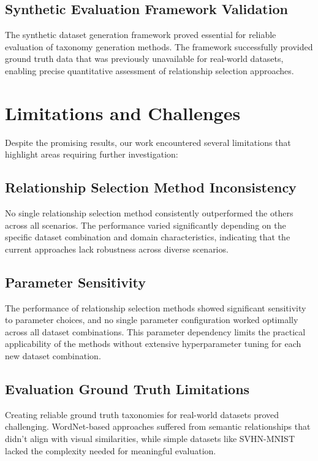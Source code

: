 \subsection{Synthetic Evaluation Framework Validation}

The synthetic dataset generation framework proved essential
for reliable evaluation of taxonomy generation methods.
The framework successfully provided ground truth data
that was previously unavailable for real-world datasets,
enabling precise quantitative assessment of relationship selection approaches.

\section{Limitations and Challenges}

Despite the promising results, our work encountered several limitations
that highlight areas requiring further investigation:

\subsection{Relationship Selection Method Inconsistency}

No single relationship selection method consistently outperformed the others across all scenarios.
The performance varied significantly depending on the specific dataset combination
and domain characteristics,
indicating that the current approaches lack robustness across diverse scenarios.

\subsection{Parameter Sensitivity}

The performance of relationship selection methods showed significant sensitivity to parameter choices,
and no single parameter configuration worked optimally across all dataset combinations.
This parameter dependency limits the practical applicability of the methods
without extensive hyperparameter tuning for each new dataset combination.

\subsection{Evaluation Ground Truth Limitations}

Creating reliable ground truth taxonomies for real-world datasets proved challenging.
WordNet-based approaches suffered from semantic relationships
that didn't align with visual similarities,
while simple datasets like SVHN-MNIST lacked the complexity needed for meaningful evaluation.


